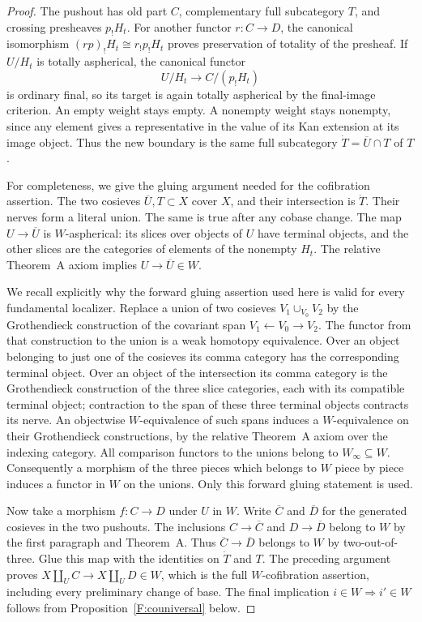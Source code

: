 \begin{proof}
The pushout has old part $C$, complementary full subcategory $T$, and
crossing presheaves $p_!H_t$. For another functor $r:C\to D$, the
canonical isomorphism
$(rp)_!H_t\cong r_!p_!H_t$ proves preservation of totality of the
presheaf. If $U/H_t$ is totally aspherical, the canonical functor
\[
 U/H_t\longrightarrow C/(p_!H_t)
\]
is ordinary final, so its target is again totally aspherical by the
final-image criterion. An empty weight stays empty. A nonempty weight
stays nonempty, since any element gives a representative in the value
of its Kan extension at its image object. Thus the new boundary is the
same full subcategory $\dot T=\overline U\cap T$ of $T$.

For completeness, we give the gluing argument needed for the
cofibration assertion. The two cosieves $\overline U,T\subset X$ cover
$X$, and their intersection is $\dot T$. Their nerves form a literal
union. The same is true after any cobase change. The map
$U\to\overline U$ is $W$-aspherical: its slices over objects of $U$
have terminal objects, and the other slices are the categories of
elements of the nonempty $H_t$. The relative Theorem~A axiom implies
$U\to\overline U\in W$.

We recall explicitly why the forward gluing assertion used here is
valid for every fundamental localizer. Replace a union of two cosieves
$V_1\cup_{V_0}V_2$ by the Grothendieck construction of the covariant
span $V_1\leftarrow V_0\to V_2$. The functor from that construction to
the union is a weak homotopy equivalence. Over an object belonging to
just one of the cosieves its comma category has the corresponding
terminal object. Over an object of the intersection its comma
category is the Grothendieck construction of the three slice
categories, each with its compatible terminal object; contraction to
the span of these three terminal objects contracts its nerve.
An objectwise $W$-equivalence of such spans induces a $W$-equivalence
on their Grothendieck constructions, by the relative Theorem~A axiom
over the indexing category. All comparison functors to the unions
belong to $W_\infty\subseteq W$. Consequently a morphism of the three
pieces which belongs to $W$ piece by piece induces a functor in $W$
on the unions. Only this forward gluing statement is used.

Now take a morphism $f:C\to D$ under $U$ in $W$. Write $\overline C$
and $\overline D$ for the generated cosieves in the two pushouts.
The inclusions $C\to\overline C$ and $D\to\overline D$ belong to
$W$ by the first paragraph and Theorem~A. Thus
$\overline C\to\overline D$ belongs to $W$ by two-out-of-three.
Glue this map with the identities on $\dot T$ and $T$. The preceding
argument proves
$X\amalg_U C\to X\amalg_U D\in W$, which is the full
$W$-cofibration assertion, including every preliminary change of base.
The final implication $i\in W\Rightarrow i'\in W$ follows from
Proposition~\ref{F:couniversal} below.
\end{proof}

